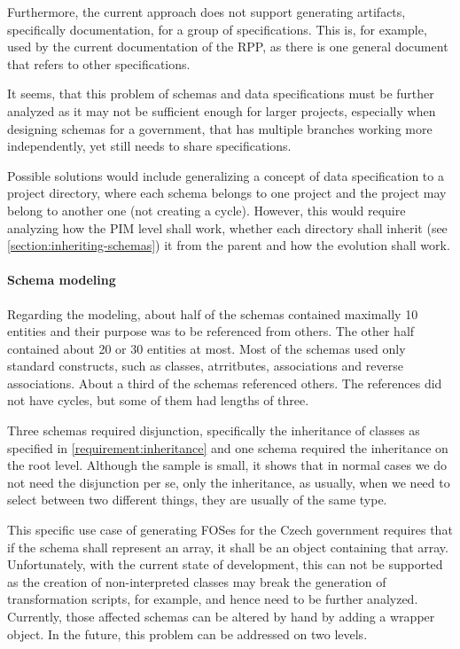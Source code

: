 Furthermore, the current approach does not support generating artifacts, specifically documentation, for a group of specifications. This is, for example, used by the current documentation of the RPP, as there is one general document that refers to other specifications.

It seems, that this problem of schemas and data specifications must be further analyzed as it may not be sufficient enough for larger projects, especially when designing schemas for a government, that has multiple branches working more independently, yet still needs to share specifications.

Possible solutions would include generalizing a concept of data specification to a project directory, where each schema belongs to one project and the project may belong to another one (not creating a cycle). However, this would require analyzing how the PIM level shall work, whether each directory shall inherit (see \autoref{section:inheriting-schemas}) it from the parent and how the evolution shall work.

\paragraph{Schema modeling} Regarding the modeling, about half of the schemas contained maximally 10 entities and their purpose was to be referenced from others. The other half contained about 20 or 30 entities at most. Most of the schemas used only standard constructs, such as classes, atrritbutes, associations and reverse associations. About a third of the schemas referenced others. The references did not have cycles, but some of them had lengths of three.

Three schemas required disjunction, specifically the inheritance of classes as specified in \autoref{requirement:inheritance} and one schema required the inheritance on the root level. Although the sample is small, it shows that in normal cases we do not need the disjunction per se, only the inheritance, as usually, when we need to select between two different things, they are usually of the same type.

\smallskip

This specific use case of generating FOSes for the Czech government requires that if the schema shall represent an array, it shall be an object containing that array. Unfortunately, with the current state of development, this can not be supported as the creation of non-interpreted classes may break the generation of transformation scripts, for example, and hence need to be further analyzed. Currently, those affected schemas can be altered by hand by adding a wrapper object. In the future, this problem can be addressed on two levels.

